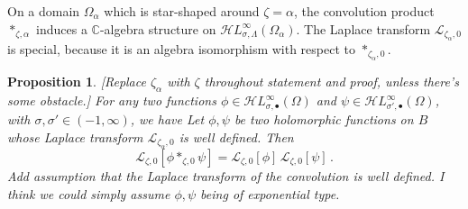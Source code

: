 \documentclass{article}
\newcommand{\singexp}[2]{\mathcal{H}L^\infty_{#1, #2}}
\newcommand{\singexpalg}[1]{\singexp{#1}{\bullet}}
\newcommand{\C}{\mathbb{C}}
\newcommand{\laplace}{\mathcal{L}}
\theoremstyle{definition}
\theoremstyle{plain}
\newtheorem{prop}[definition]{Proposition}
\newenvironment{todo}{\color{Coral}}{\color{black}}
\newenvironment{old}{\color{RoyalBlue}}{\color{black}}
\newenvironment{revised}{\color{DarkBlue}}{\color{black}}
\newenvironment{revised}{}{}
\begin{document}
On a domain $\Omega_\alpha$ which is star-shaped around $\zeta = \alpha$, the convolution product $\ast_{\zeta, \alpha}$ induces a $\C$-algebra structure on $\singexp{\sigma}{\Lambda}(\Omega_\alpha)$. The Laplace transform $\laplace_{\zeta_\alpha, 0}$ is special, because it is an algebra isomorphism with respect to $\ast_{\zeta_\alpha, 0}$.
\begin{prop}\label{prop:convolution_iso_laplace}
\begin{todo}[Replace $\zeta_\alpha$ with $\zeta$ throughout statement and proof, unless there's some obstacle.]\end{todo} \begin{revised}For any two functions $\phi \in \singexpalg{\sigma}(\Omega)$ and $\psi \in \singexpalg{\sigma'}(\Omega)$, with $\sigma, \sigma' \in (-1, \infty)$, we have\end{revised} \begin{old}Let $\phi,\psi$ be two holomorphic functions on $B$ whose Laplace transform $\laplace_{\zeta_\alpha,0}$ is well defined. Then\end{old}
\begin{equation}\label{eqn:laplace-convol1}
\laplace_{\zeta,0}[\phi\ast_{\zeta,0}\psi]=\laplace_{\zeta,0}[\phi]\,\laplace_{\zeta,0}[\psi]\,.
\end{equation}
\begin{todo}
Add assumption that the Laplace transform of the convolution is well defined. I think we could simply assume $\phi,\psi$ being of exponential type.    
\end{todo}
\end{prop}
\end{document}
